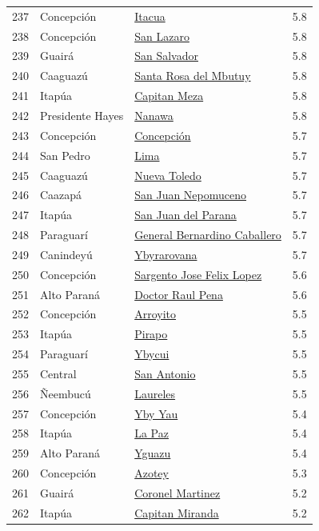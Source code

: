 {\begin{longtable}[]{@{}llll@{}}
237 & Concepción & \hyperref[dist:01_Concepción:Itacua]{Itacua} & 5.8 \\
238 & Concepción & \hyperref[dist:01_Concepción:San_Lazaro]{San Lazaro} & 5.8 \\
239 & Guairá & \hyperref[dist:04_Guaira:San_Salvador]{San Salvador} & 5.8 \\
240 & Caaguazú & \hyperref[dist:05_Caaguazu:Santa_Rosa_del_Mbutuy]{Santa Rosa del Mbutuy} & 5.8 \\
241 & Itapúa & \hyperref[dist:07_Itapua:Capitan_Meza]{Capitan Meza} & 5.8 \\
242 & Presidente Hayes & \hyperref[dist:15_Presidente_Hayes:Nanawa]{Nanawa} & 5.8 \\
243 & Concepción & \hyperref[dist:01_Concepción:Concepción]{Concepción} & 5.7 \\
244 & San Pedro & \hyperref[dist:02_San_Pedro:Lima]{Lima} & 5.7 \\
245 & Caaguazú & \hyperref[dist:05_Caaguazu:Nueva_Toledo]{Nueva Toledo} & 5.7 \\
246 & Caazapá & \hyperref[dist:06_Caazapa:San_Juan_Nepomuceno]{San Juan Nepomuceno} & 5.7 \\
247 & Itapúa & \hyperref[dist:07_Itapua:San_Juan_del_Parana]{San Juan del Parana} & 5.7 \\
248 & Paraguarí & \hyperref[dist:09_Paraguari:General_Bernardino_Caballero]{General Bernardino Caballero} & 5.7 \\
249 & Canindeyú & \hyperref[dist:14_Canindeyu:Ybyrarovana]{Ybyrarovana} & 5.7 \\
250 & Concepción & \hyperref[dist:01_Concepción:Sargento_Jose_Felix_Lopez]{Sargento Jose Felix Lopez} & 5.6 \\
251 & Alto Paraná & \hyperref[dist:10_Alto_Parana:Doctor_Raul_Pena]{Doctor Raul Pena} & 5.6 \\
252 & Concepción & \hyperref[dist:01_Concepción:Arroyito]{Arroyito} & 5.5 \\
253 & Itapúa & \hyperref[dist:07_Itapua:Pirapo]{Pirapo} & 5.5 \\
254 & Paraguarí & \hyperref[dist:09_Paraguari:Ybycui]{Ybycui} & 5.5 \\
255 & Central & \hyperref[dist:11_Central:San_Antonio]{San Antonio} & 5.5 \\
256 & Ñeembucú & \hyperref[dist:12_Neembucu:Laureles]{Laureles} & 5.5 \\
257 & Concepción & \hyperref[dist:01_Concepción:Yby_Yau]{Yby Yau} & 5.4 \\
258 & Itapúa & \hyperref[dist:07_Itapua:La_Paz]{La Paz} & 5.4 \\
259 & Alto Paraná & \hyperref[dist:10_Alto_Parana:Yguazu]{Yguazu} & 5.4 \\
260 & Concepción & \hyperref[dist:01_Concepción:Azotey]{Azotey} & 5.3 \\
261 & Guairá & \hyperref[dist:04_Guaira:Coronel_Martinez]{Coronel Martinez} & 5.2 \\
262 & Itapúa & \hyperref[dist:07_Itapua:Capitan_Miranda]{Capitan Miranda} & 5.2 \\
\end{longtable}
}
